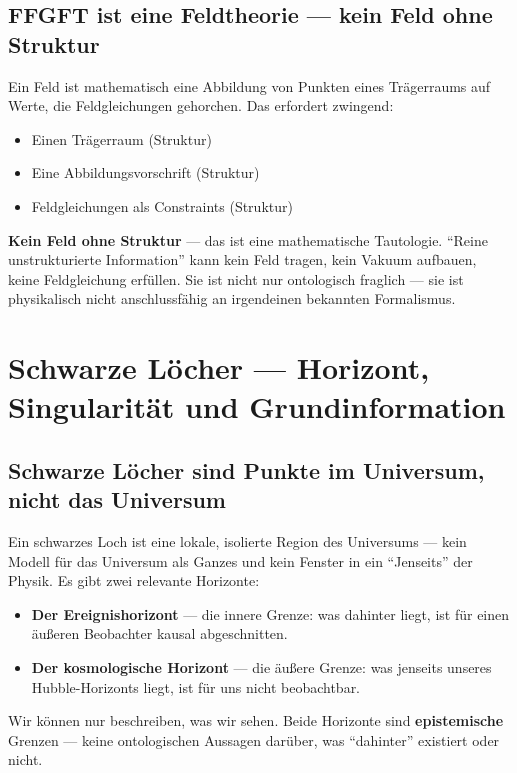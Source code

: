 \subsection{FFGFT ist eine Feldtheorie --- kein Feld ohne Struktur}

Ein Feld ist mathematisch eine Abbildung von Punkten eines Trägerraums auf Werte, die Feldgleichungen gehorchen. Das erfordert zwingend:
\begin{itemize}
  \item Einen Trägerraum (Struktur)
  \item Eine Abbildungsvorschrift (Struktur)
  \item Feldgleichungen als Constraints (Struktur)
\end{itemize}

\textbf{Kein Feld ohne Struktur} --- das ist eine mathematische Tautologie. ``Reine unstrukturierte Information'' kann kein Feld tragen, kein Vakuum aufbauen, keine Feldgleichung erfüllen. Sie ist nicht nur ontologisch fraglich --- sie ist physikalisch nicht anschlussfähig an irgendeinen bekannten Formalismus.

\section{Schwarze Löcher --- Horizont, Singularität und Grundinformation}

\subsection{Schwarze Löcher sind Punkte im Universum, nicht das Universum}

Ein schwarzes Loch ist eine lokale, isolierte Region des Universums --- kein Modell für das Universum als Ganzes und kein Fenster in ein ``Jenseits'' der Physik. Es gibt zwei relevante Horizonte:
\begin{itemize}
  \item \textbf{Der Ereignishorizont} --- die innere Grenze: was dahinter liegt, ist für einen äußeren Beobachter kausal abgeschnitten.
  \item \textbf{Der kosmologische Horizont} --- die äußere Grenze: was jenseits unseres Hubble-Horizonts liegt, ist für uns nicht beobachtbar.
\end{itemize}

Wir können nur beschreiben, was wir sehen. Beide Horizonte sind \textbf{epistemische} Grenzen --- keine ontologischen Aussagen darüber, was ``dahinter'' existiert oder nicht.

